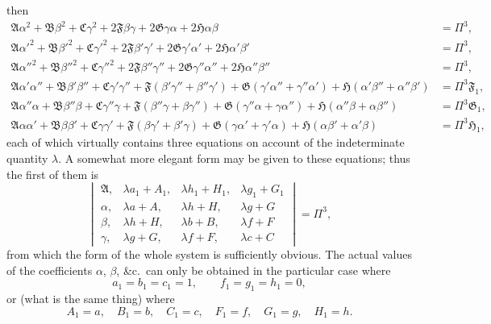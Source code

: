 \documentclass[11pt,a4paper]{article}
\theoremstyle{definition}
\begin{document}
then
\begin{align*}
\mathfrak{A}\alpha^{2} + \mathfrak{B}\beta^{2} + \mathfrak{C}\gamma^{2} + 2\mathfrak{F}\beta\gamma + 2\mathfrak{G}\gamma\alpha + 2\mathfrak{H}\alpha\beta &= \Pi^{3}, \\
\mathfrak{A}\alpha'^{2} + \mathfrak{B}\beta'^{2} + \mathfrak{C}\gamma'^{2} + 2\mathfrak{F}\beta'\gamma' + 2\mathfrak{G}\gamma'\alpha' + 2\mathfrak{H}\alpha'\beta' &= \Pi^{3}, \\
\mathfrak{A}\alpha''^{2} + \mathfrak{B}\beta''^{2} + \mathfrak{C}\gamma''^{2} + 2\mathfrak{F}\beta''\gamma'' + 2\mathfrak{G}\gamma''\alpha'' + 2\mathfrak{H}\alpha''\beta'' &= \Pi^{3}, \\
\mathfrak{A}\alpha'\alpha'' + \mathfrak{B}\beta'\beta'' + \mathfrak{C}\gamma'\gamma'' + \mathfrak{F}(\beta'\gamma'' + \beta''\gamma') + \mathfrak{G}(\gamma'\alpha'' + \gamma''\alpha') + \mathfrak{H}(\alpha'\beta'' + \alpha''\beta') &= \Pi^{3}\mathfrak{F}_{1}, \\
\mathfrak{A}\alpha''\alpha + \mathfrak{B}\beta''\beta + \mathfrak{C}\gamma''\gamma + \mathfrak{F}(\beta''\gamma + \beta\gamma'') + \mathfrak{G}(\gamma''\alpha + \gamma\alpha'') + \mathfrak{H}(\alpha''\beta + \alpha\beta'') &= \Pi^{3}\mathfrak{G}_{1}, \\
\mathfrak{A}\alpha\alpha' + \mathfrak{B}\beta\beta' + \mathfrak{C}\gamma\gamma' + \mathfrak{F}(\beta\gamma' + \beta'\gamma) + \mathfrak{G}(\gamma\alpha' + \gamma'\alpha) + \mathfrak{H}(\alpha\beta' + \alpha'\beta) &= \Pi^{3}\mathfrak{H}_{1},
\end{align*}
each of which virtually contains three equations on account of the indeterminate quantity $\lambda$. A somewhat more elegant form may be given to these equations; thus the first of them is
\[
\begin{vmatrix}
\mathfrak{A}, & \lambda a_{1} + A_{1}, & \lambda h_{1} + H_{1}, & \lambda g_{1} + G_{1} \\
\alpha, & \lambda a + A, & \lambda h + H, & \lambda g + G \\
\beta, & \lambda h + H, & \lambda b + B, & \lambda f + F \\
\gamma, & \lambda g + G, & \lambda f + F, & \lambda c + C
\end{vmatrix}
= \Pi^{3},
\]
from which the form of the whole system is sufficiently obvious. The actual values of the coefficients $\alpha$, $\beta$, \&c.\ can only be obtained in the particular case where
\[
a_{1} = b_{1} = c_{1} = 1, \qquad f_{1} = g_{1} = h_{1} = 0,
\]
or (what is the same thing) where
\[
A_{1} = a, \quad B_{1} = b, \quad C_{1} = c, \quad F_{1} = f, \quad G_{1} = g, \quad H_{1} = h.
\]
\end{document}
